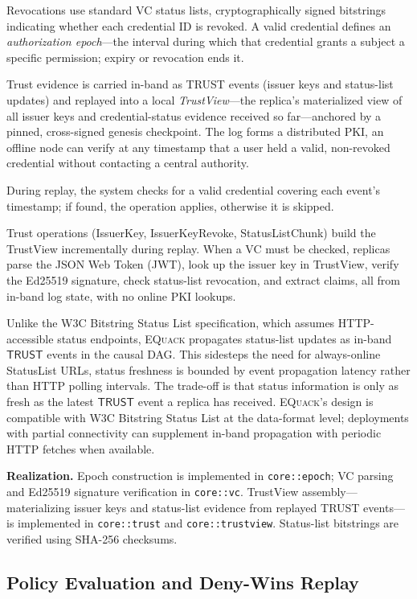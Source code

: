 \documentclass[10pt,journal,compsoc]{IEEEtran}
\newcommand{\equack}{\textsc{EQuack}}
\begin{document}
Revocations use standard VC status lists, cryptographically signed bitstrings indicating whether each credential ID is revoked. A valid credential defines an \emph{authorization epoch}---the interval during which that credential grants a subject a specific permission; expiry or revocation ends it.

Trust evidence is carried in-band as TRUST events (issuer keys and status-list updates) and replayed into a local \emph{TrustView}---the replica's materialized view of all issuer keys and credential-status evidence received so far---anchored by a pinned, cross-signed genesis checkpoint. The log forms a distributed PKI, an offline node can verify at any timestamp that a user held a valid, non-revoked credential without contacting a central authority.

During replay, the system checks for a valid credential covering each event's timestamp; if found, the operation applies, otherwise it is skipped.

Trust operations (IssuerKey, IssuerKeyRevoke, StatusListChunk) build the TrustView incrementally during replay. When a VC must be checked, replicas parse the JSON Web Token (JWT), look up the issuer key in TrustView, verify the Ed25519 signature, check status-list revocation, and extract claims, all from in-band log state, with no online PKI lookups.

Unlike the W3C Bitstring Status List specification, which assumes HTTP-accessible status endpoints, \equack{} propagates status-list updates as in-band $\mathsf{TRUST}$ events in the causal DAG. This sidesteps the need for always-online StatusList URLs, status freshness is bounded by event propagation latency rather than HTTP polling intervals. The trade-off is that status information is only as fresh as the latest $\mathsf{TRUST}$ event a replica has received. \equack{}'s design is compatible with W3C Bitstring Status List at the data-format level; deployments with partial connectivity can supplement in-band propagation with periodic HTTP fetches when available.

\textbf{Realization.} Epoch construction is implemented in \texttt{core::epoch}; VC parsing and Ed25519 signature verification in \texttt{core::vc}. TrustView assembly---materializing issuer keys and status-list evidence from replayed TRUST events---is implemented in \texttt{core::trust} and \texttt{core::trustview}. Status-list bitstrings are verified using SHA-256 checksums.

\subsection{Policy Evaluation and Deny-Wins Replay}
\end{document}
